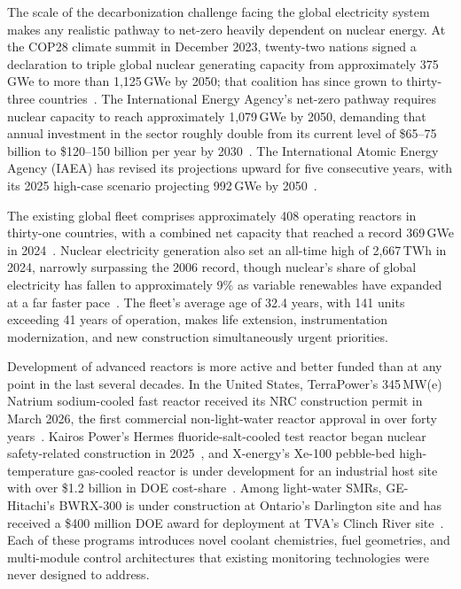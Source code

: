 The scale of the decarbonization challenge facing the global electricity
system makes any realistic pathway to net-zero heavily dependent on nuclear
energy. At the COP28 climate summit in December 2023, twenty-two nations
signed a declaration to triple global nuclear generating capacity from
approximately 375\,GWe to more than 1,125\,GWe by 2050; that coalition
has since grown to thirty-three countries~\cite{DOE_COP28_2023}. %
The
International Energy Agency's net-zero pathway requires nuclear capacity to
reach approximately 1,079\,GWe by 2050, demanding that annual
investment in the sector roughly double from its current level of
\$65--75 billion to \$120--150 billion per year by 2030~\cite{IEA_Nuclear_2024}. %
The International Atomic Energy Agency (IAEA) has revised its projections
upward for five consecutive years, with its 2025 high-case scenario projecting
992\,GWe by 2050~\cite{IAEA_Projections_2025}. %

The existing global fleet comprises approximately 408 operating reactors
in thirty-one countries, with a combined net capacity that reached a record
369\,GWe in 2024~\cite{WNISR_2025}. Nuclear electricity generation also
set an all-time high of 2,667\,TWh in 2024, narrowly surpassing the 2006
record, though nuclear's share of global electricity has fallen to
approximately 9\% as variable renewables have expanded at a far faster
pace~\cite{WNISR_2025}. The fleet's average age of 32.4 years, with 141
units exceeding 41 years of operation, makes life extension, instrumentation
modernization, and new construction simultaneously urgent priorities.

Development of advanced reactors is more active and better funded than
at any point in the last several decades. In the United
States, TerraPower's 345\,MW(e) Natrium sodium-cooled fast reactor received
its NRC construction permit in March 2026, the first commercial non-light-water
reactor approval in over forty years~\cite{PowerMag_Natrium_2026}. Kairos
Power's Hermes fluoride-salt-cooled test reactor began nuclear
safety-related construction in 2025~\cite{Kairos_Hermes_2025}, and
X-energy's Xe-100 pebble-bed high-temperature gas-cooled reactor is under
development for an industrial host site with over \$1.2 billion in DOE
cost-share~\cite{Xenergy_ARDP}. Among light-water SMRs, GE-Hitachi's
BWRX-300 is under construction at Ontario's Darlington site and has
received a \$400 million DOE award for deployment at TVA's Clinch River
site~\cite{BWRX300_Wiki}. Each of these programs introduces novel
coolant chemistries, fuel geometries, and multi-module control architectures
that existing monitoring technologies were never designed to address.

